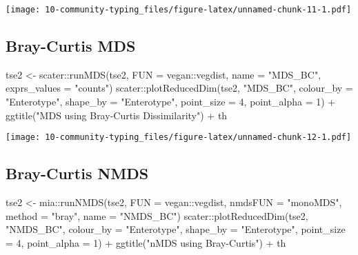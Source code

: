 \documentclass[
  oneside]{book}
\newenvironment{Shaded}{\begin{snugshade}}{\end{snugshade}}
\newcommand{\AttributeTok}[1]{\textcolor[rgb]{0.77,0.63,0.00}{#1}}
\newcommand{\DecValTok}[1]{\textcolor[rgb]{0.00,0.00,0.81}{#1}}
\newcommand{\FunctionTok}[1]{\textcolor[rgb]{0.00,0.00,0.00}{#1}}
\newcommand{\NormalTok}[1]{#1}
\newcommand{\OtherTok}[1]{\textcolor[rgb]{0.56,0.35,0.01}{#1}}
\newcommand{\SpecialCharTok}[1]{\textcolor[rgb]{0.00,0.00,0.00}{#1}}
\newcommand{\StringTok}[1]{\textcolor[rgb]{0.31,0.60,0.02}{#1}}
\begin{document}
\texttt{[image: 10-community-typing\_files/figure-latex/unnamed-chunk-11-1.pdf]}

\hypertarget{bray-curtis-mds}{%
\subsection{Bray-Curtis MDS}\label{bray-curtis-mds}}

\begin{Shaded}
\begin{Highlighting}[]
\NormalTok{tse2 }\OtherTok{\textless{}{-}}\NormalTok{ scater}\SpecialCharTok{::}\FunctionTok{runMDS}\NormalTok{(tse2, }\AttributeTok{FUN =}\NormalTok{ vegan}\SpecialCharTok{::}\NormalTok{vegdist, }\AttributeTok{name =} \StringTok{"MDS\_BC"}\NormalTok{, }\AttributeTok{exprs\_values =} \StringTok{"counts"}\NormalTok{)}
\NormalTok{scater}\SpecialCharTok{::}\FunctionTok{plotReducedDim}\NormalTok{(tse2, }\StringTok{"MDS\_BC"}\NormalTok{, }\AttributeTok{colour\_by =} \StringTok{"Enterotype"}\NormalTok{, }
                       \AttributeTok{shape\_by =} \StringTok{"Enterotype"}\NormalTok{, }\AttributeTok{point\_size =} \DecValTok{4}\NormalTok{, }\AttributeTok{point\_alpha =} \DecValTok{1}\NormalTok{) }\SpecialCharTok{+}
                       \FunctionTok{ggtitle}\NormalTok{(}\StringTok{"MDS using Bray{-}Curtis Dissimilarity"}\NormalTok{) }\SpecialCharTok{+}\NormalTok{ th}
\end{Highlighting}
\end{Shaded}

\texttt{[image: 10-community-typing\_files/figure-latex/unnamed-chunk-12-1.pdf]}

\hypertarget{bray-curtis-nmds}{%
\subsection{Bray-Curtis NMDS}\label{bray-curtis-nmds}}

\begin{Shaded}
\begin{Highlighting}[]
\NormalTok{tse2 }\OtherTok{\textless{}{-}}\NormalTok{ mia}\SpecialCharTok{::}\FunctionTok{runNMDS}\NormalTok{(tse2, }\AttributeTok{FUN =}\NormalTok{ vegan}\SpecialCharTok{::}\NormalTok{vegdist, }\AttributeTok{nmdsFUN =} \StringTok{"monoMDS"}\NormalTok{, }\AttributeTok{method =} \StringTok{"bray"}\NormalTok{, }\AttributeTok{name =} \StringTok{"NMDS\_BC"}\NormalTok{)}
\NormalTok{scater}\SpecialCharTok{::}\FunctionTok{plotReducedDim}\NormalTok{(tse2, }\StringTok{"NMDS\_BC"}\NormalTok{, }\AttributeTok{colour\_by =} \StringTok{"Enterotype"}\NormalTok{, }
                       \AttributeTok{shape\_by =} \StringTok{"Enterotype"}\NormalTok{, }\AttributeTok{point\_size =} \DecValTok{4}\NormalTok{, }\AttributeTok{point\_alpha =} \DecValTok{1}\NormalTok{) }\SpecialCharTok{+} 
                       \FunctionTok{ggtitle}\NormalTok{(}\StringTok{"nMDS using Bray{-}Curtis"}\NormalTok{) }\SpecialCharTok{+}\NormalTok{ th}
\end{Highlighting}
\end{Shaded}
\end{document}
